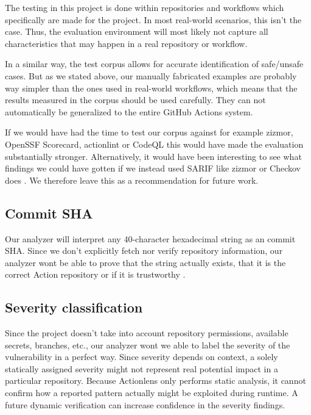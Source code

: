 \documentclass{article}
\begin{document}
The testing in this project is done within repositories and workflows which specifically are made for the project. In most real-world scenarios, this isn't the case. Thus, the evaluation environment will most likely not capture all characteristics that may happen in a real repository or workflow. 

In a similar way, the test corpus allows for accurate identification of safe/unsafe cases. But as we stated above, our manually fabricated examples are probably way simpler than the ones used in real-world workflows, which means that the results measured in the corpus should be used carefully. They can not automatically be generalized to the entire GitHub Actions system. 

If we would have had the time to test our corpus against for example zizmor, OpenSSF Scorecard, actionlint or CodeQL this would have made the evaluation substantially stronger. Alternatively, it would have been interesting to see what findings we could have gotten if we instead used SARIF like zizmor or Checkov does \cite{zizmor,checkov,githubsarif}. We therefore leave this as a recommendation for future work. 

\subsection{Commit SHA}

Our analyzer will interpret any 40-character hexadecimal string as an commit SHA. Since we don't explicitly fetch nor verify repository information, our analyzer wont be able to prove that the string actually exists, that it is the correct Action repository or if it is trustworthy \cite{githubsecurity}. 

\subsection{Severity classification}

Since the project doesn't take into account repository permissions, available secrets, branches, etc., our analyzer wont we able to label the severity of the vulnerability in a perfect way. Since severity depends on context, a solely statically assigned severity might not represent real potential impact in a particular repository. Because Actionlens only performs static analysis, it cannot confirm how a reported pattern actually might be exploited during runtime. A future dynamic verification can increase confidence in the severity findings.
\end{document}
